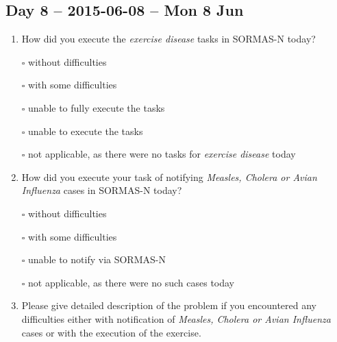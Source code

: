 \documentclass[a4paper, titlepage]{tufte-handout}
\begin{document}
\subsection{Day 8 -- 2015-06-08 -- Mon  8 Jun}
\label{sec-8-6}
\begin{enumerate}
\item How did you execute the \emph{exercise disease} tasks in SORMAS-N today?

\quad $\square$ without difficulties

\quad $\square$ with some difficulties

\quad $\square$ unable to fully execute the tasks

\quad $\square$ unable to execute the tasks

\quad $\square$ not applicable, as there were no tasks for \emph{exercise disease} today

\item How did you execute your task of notifying \emph{Measles, Cholera or Avian Influenza} cases in SORMAS-N today?

\quad $\square$ without difficulties

\quad $\square$ with some difficulties

\quad $\square$ unable to notify via SORMAS-N

\quad $\square$ not applicable, as there were no such cases today

\item Please give detailed description of the problem if you encountered any difficulties either with notification of \emph{Measles, Cholera or Avian Influenza} cases or with the execution of the exercise.

\hrulefill

\hrulefill

\hrulefill

\hrulefill

\hrulefill

\hrulefill

\hrulefill

\hrulefill

\hrulefill

\hrulefill
\end{enumerate}

\newpage
\end{document}
